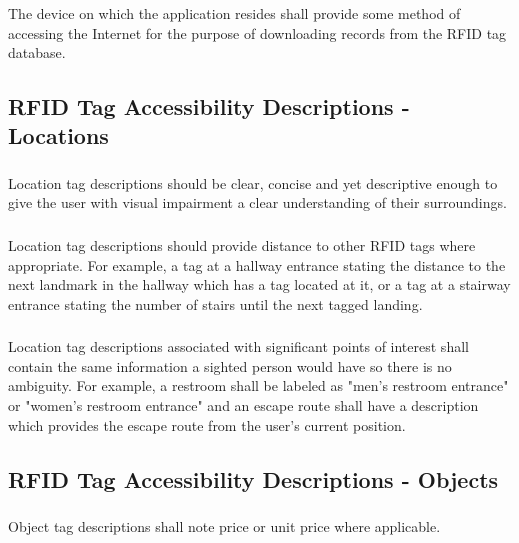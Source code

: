 \documentclass{article}
\begin{document}
\subsubsection{} The device on which the application resides shall provide some method of accessing the Internet for the purpose of downloading records from the RFID tag database.

\subsection{RFID Tag Accessibility Descriptions - Locations}

\subsubsection{} Location tag descriptions should be clear, concise and yet descriptive enough to give the user with visual impairment a clear understanding of their surroundings. 

\subsubsection{} Location tag descriptions should provide distance to other RFID tags where appropriate. For example, a tag at a hallway entrance stating the distance to the next landmark in the hallway which has a tag located at it, or a tag at a stairway entrance stating the number of stairs until the next tagged landing.

\subsubsection{} Location tag descriptions associated with significant points of interest shall contain the same information a sighted person would have so there is no ambiguity. For example, a restroom shall be labeled as "men's restroom entrance" or "women's restroom entrance" and an escape route shall have a description which provides the escape route from the user's current position.

\subsection{RFID Tag Accessibility Descriptions - Objects}

\subsubsection{} Object tag descriptions shall note price or unit price where applicable.
\end{document}
